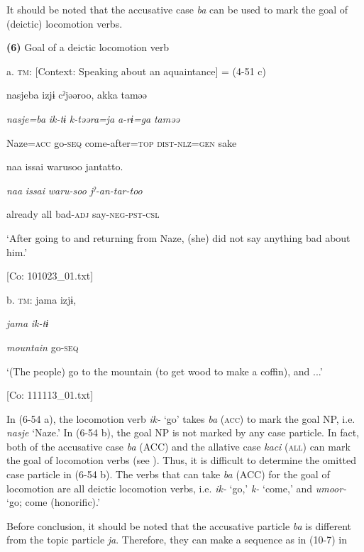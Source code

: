 It should be noted that the accusative case \textit{ba} can be used to mark the goal of (deictic) locomotion verbs.

\textbf{(6)}  Goal of a deictic locomotion verb

  a.  \textsc{tm}:  [Context: Speaking about an aquaintance] = (4-51 c)

      nasjeba  izjɨ  cˀjəəroo,  akka  taməə

      \textit{nasje=ba}  \textit{ik-tɨ}  \textit{k-təəra=ja}  \textit{a-rɨ=ga}  \textit{taməə}

      Naze=\textsc{acc}  go-\textsc{seq}  come-after=\textsc{top}  \textsc{dist}-\textsc{nlz}=\textsc{gen}  sake

      naa  issai  warusoo  jantatto.

      \textit{naa}  \textit{issai}  \textit{waru-soo}  \textit{jˀ-an-tar-too}

      already  all  bad-\textsc{adj}  say-\textsc{neg}-\textsc{pst}-\textsc{csl}

      ‘After going to and returning from Naze, (she) did not say anything bad about him.’

      [Co: 101023\_01.txt]

  b.  \textsc{tm}:  jama  izjɨ,

      \textit{jama}  \textit{ik-tɨ}

      \textit{mountain}  go-\textsc{seq}

      ‘(The people) go to the mountain (to get wood to make a coffin), and ...’

      [Co: 111113\_01.txt]

In (6-54 a), the locomotion verb \textit{ik-} ‘go’ takes \textit{ba} (\textsc{acc}) to mark the goal NP, i.e. \textit{nasje} ‘Naze.’ In (6-54 b), the goal NP is not marked by any case particle. In fact, both of the accusative case \textit{ba} (ACC) and the allative case \textit{kaci} (\textsc{all}) can mark the goal of locomotion verbs (see ). Thus, it is difficult to determine the omitted case particle in (6-54 b). The verbs that can take \textit{ba} (ACC) for the goal of locomotion are all deictic locomotion verbs, i.e. \textit{ik-} ‘go,’ \textit{k-} ‘come,’ and \textit{umoor-} ‘go; come (honorific).’

  Before conclusion, it should be noted that the accusative particle \textit{ba} is different from the topic particle \textit{ja}. Therefore, they can make a sequence as in (10-7) in 

